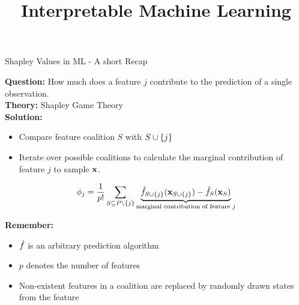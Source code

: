 \documentclass[11pt,compress,t,notes=noshow, aspectratio=169, xcolor=table]{beamer}
\title{Interpretable Machine Learning}
\date{}
\begin{document}
\newcommand{\titlefigure}{figure_man/exSHAP.png}
\newcommand{\learninggoals}{
\item Get an intuition of additive feature attributions
\item Understand the concept of Kernel SHAP
\item Ability to interpret SHAP plots
\item Global SHAP methods
}


\begin{frame}{Shapley Values in ML - A short Recap}
  
  \textbf{Question:} How much does a feature $j$ contribute to the prediction of a single observation. \\
  \textbf{Theory:} Shapley Game Theory \\
  \textbf{Solution:} 
  \begin{itemize}
    \item Compare feature coalition $S$ with $\Scupj$ 
    \item Iterate over possible coalitions to calculate the marginal contribution of feature $j$ to sample $\xv$. 
\end{itemize}

     $$ \phi_j  = \frac{1}{p!} \sum_{S \subseteq P\setminus \{j\}} \underbrace{\fh_{\Scupj}(\xv_{\Scupj}) - \fh_{S}(\xv_{S})}_{\text{marginal contribution of feature $j$}} $$

\textbf{Remember:}

\begin{itemize}
    \item $\fh$ is an arbitrary prediction algorithm
    \item $p$ denotes the number of features
    \item Non-existent features in a coalition are replaced by randomly drawn states from the feature
\end{itemize}

\end{frame}
\end{document}
